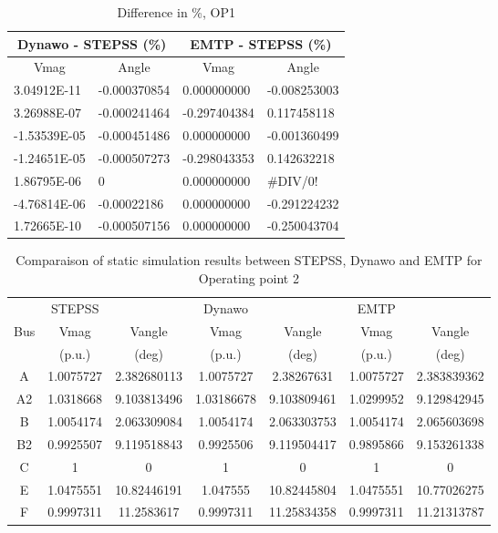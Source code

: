 \documentclass{report}
\begin{document}
\begin{table}[H]
\centering
\caption{Difference in \%, OP1}
\begin{tabular}{ll|ll}
\multicolumn{2}{c|}{Dynawo - STEPSS (\%)}                      & \multicolumn{2}{c}{EMTP - STEPSS (\%)}                        \\ \hline
\multicolumn{1}{c|}{Vmag}         & \multicolumn{1}{c|}{Angle} & \multicolumn{1}{c|}{Vmag}         & \multicolumn{1}{c}{Angle} \\ \hline
\multicolumn{1}{l|}{3.04912E-11}  & -0.000370854               & \multicolumn{1}{l|}{0.000000000}  & -0.008253003              \\
\multicolumn{1}{l|}{3.26988E-07}  & -0.000241464               & \multicolumn{1}{l|}{-0.297404384} & 0.117458118               \\
\multicolumn{1}{l|}{-1.53539E-05} & -0.000451486               & \multicolumn{1}{l|}{0.000000000}  & -0.001360499              \\
\multicolumn{1}{l|}{-1.24651E-05} & -0.000507273               & \multicolumn{1}{l|}{-0.298043353} & 0.142632218               \\
\multicolumn{1}{l|}{1.86795E-06}  & 0                          & \multicolumn{1}{l|}{0.000000000}  & \#DIV/0!                  \\
\multicolumn{1}{l|}{-4.76814E-06} & -0.00022186                & \multicolumn{1}{l|}{0.000000000}  & -0.291224232              \\
\multicolumn{1}{l|}{1.72665E-10}  & -0.000507156               & \multicolumn{1}{l|}{0.000000000}  & -0.250043704             
\end{tabular}
\label{static_diff_OP1}
\end{table}

\begin{table}[H]
\centering
\caption{Comparaison of static simulation results between STEPSS, Dynawo and EMTP for Operating point 2}

\begin{tabular}{c|c c|c c|c c|} 
& STEPSS && Dynawo  && EMTP &\\ 
Bus & Vmag  & Vangle  & Vmag & Vangle &  Vmag & Vangle \\ 
&   (p.u.) & (deg) &  (p.u.) & (deg) &  (p.u.) & (deg) \\
\hline
A & 1.0075727 & 2.382680113 & 1.0075727 & 2.38267631 & 1.0075727 & 2.383839362 \\ 
A2 & 1.0318668 & 9.103813496 & 1.03186678 & 9.103809461 & 1.0299952 & 9.129842945 \\
B & 1.0054174 & 2.063309084 & 1.0054174 & 2.063303753 & 1.0054174 & 2.065603698 \\
B2 & 0.9925507 & 9.119518843 & 0.9925506 & 9.119504417 & 0.9895866 & 9.153261338 \\
C & 1 & 0 & 1 & 0 & 1 & 0 \\
E & 1.0475551 & 10.82446191 & 1.047555 & 10.82445804 & 1.0475551 & 10.77026275 \\
F & 0.9997311 & 11.2583617 & 0.9997311 & 11.25834358 & 0.9997311 & 11.21313787 \\ 
\end{tabular}
\label{static_OP2}
\end{table}
\end{document}

